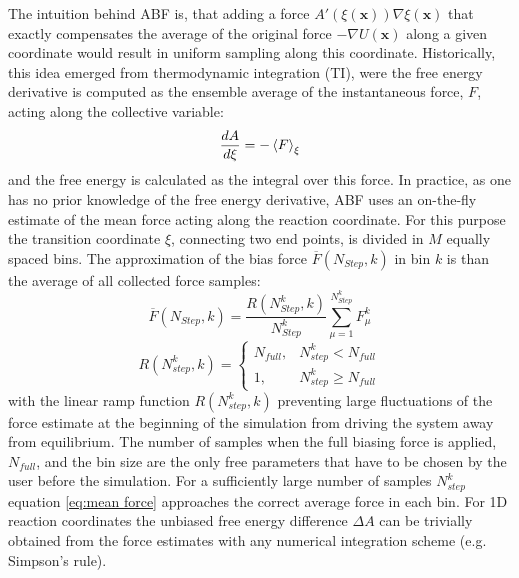 The intuition behind ABF is, that adding a force $A'(\xi(\textbf{x}))\nabla\xi(\textbf{x})$ that exactly compensates the average of the original force $-\nabla U(\textbf{x})$ along a given coordinate would result in uniform sampling along this coordinate.\autocite{comer2015adaptive}
Historically, this idea emerged from thermodynamic integration (TI), were the free energy derivative  is computed as the ensemble average of the instantaneous force, $F$, acting along the collective variable:
\begin{equation}
\frac{dA}{d\xi} = -\braket{F}_{\xi}
\end{equation}
and the free energy is calculated as the integral over this force.\autocite{kirkwood1935statistical,zwanzig1954high}
In practice, as one has no prior knowledge of the free energy derivative, ABF uses an on-the-fly estimate of the mean force acting along the reaction coordinate. For this purpose the transition coordinate $\xi$, connecting two end points, is divided in $M$ equally spaced bins. The approximation of the bias force $\overline{F}(N_{Step},k)$ in bin $k$ is than the average of all collected force samples:\autocite{comer2015adaptive}
\begin{equation}
  \overline{F}(N_{Step},k) = \frac{R(N_{Step}^k,k)}{N_{Step}^{k}} \sum_{\mu=1}^{N_{Step}^{k}} F_{\mu}^{k}
  \label{eq:mean force}
\end{equation}
\begin{equation}
  R(N_{step}^k,k)=\left\{\begin{array}{ll} N_{full}, & N_{step}^{k} < N_{full} \\
                                         1,  & N_{step}^{k} \geq  N_{full} \end{array}\right. \label{eq:ramp}
\end{equation}
with the linear ramp function $R(N_{step}^k,k)$ preventing large fluctuations of the force estimate at the beginning of the simulation from driving the system away from equilibrium. The number of samples when the full biasing force is applied, $N_{full}$, and the bin size are the only free parameters that have to be chosen by the user before the simulation.
For a sufficiently large number of samples $N_{step}^k$ equation \ref{eq:mean force} approaches the correct average force in each bin.\autocite{comer2015adaptive} For 1D reaction coordinates the unbiased free energy difference $\Delta A$ can be trivially obtained from the force estimates with any numerical integration scheme (e.g. Simpson's rule).

